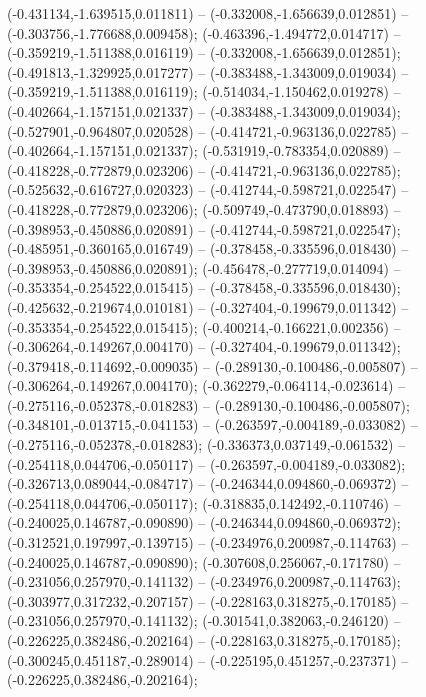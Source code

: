 (-0.431134,-1.639515,0.011811) -- (-0.332008,-1.656639,0.012851) -- (-0.303756,-1.776688,0.009458);
 (-0.463396,-1.494772,0.014717) -- (-0.359219,-1.511388,0.016119) -- (-0.332008,-1.656639,0.012851);
 (-0.491813,-1.329925,0.017277) -- (-0.383488,-1.343009,0.019034) -- (-0.359219,-1.511388,0.016119);
 (-0.514034,-1.150462,0.019278) -- (-0.402664,-1.157151,0.021337) -- (-0.383488,-1.343009,0.019034);
 (-0.527901,-0.964807,0.020528) -- (-0.414721,-0.963136,0.022785) -- (-0.402664,-1.157151,0.021337);
 (-0.531919,-0.783354,0.020889) -- (-0.418228,-0.772879,0.023206) -- (-0.414721,-0.963136,0.022785);
 (-0.525632,-0.616727,0.020323) -- (-0.412744,-0.598721,0.022547) -- (-0.418228,-0.772879,0.023206);
 (-0.509749,-0.473790,0.018893) -- (-0.398953,-0.450886,0.020891) -- (-0.412744,-0.598721,0.022547);
 (-0.485951,-0.360165,0.016749) -- (-0.378458,-0.335596,0.018430) -- (-0.398953,-0.450886,0.020891);
 (-0.456478,-0.277719,0.014094) -- (-0.353354,-0.254522,0.015415) -- (-0.378458,-0.335596,0.018430);
 (-0.425632,-0.219674,0.010181) -- (-0.327404,-0.199679,0.011342) -- (-0.353354,-0.254522,0.015415);
 (-0.400214,-0.166221,0.002356) -- (-0.306264,-0.149267,0.004170) -- (-0.327404,-0.199679,0.011342);
 (-0.379418,-0.114692,-0.009035) -- (-0.289130,-0.100486,-0.005807) -- (-0.306264,-0.149267,0.004170);
 (-0.362279,-0.064114,-0.023614) -- (-0.275116,-0.052378,-0.018283) -- (-0.289130,-0.100486,-0.005807);
 (-0.348101,-0.013715,-0.041153) -- (-0.263597,-0.004189,-0.033082) -- (-0.275116,-0.052378,-0.018283);
 (-0.336373,0.037149,-0.061532) -- (-0.254118,0.044706,-0.050117) -- (-0.263597,-0.004189,-0.033082);
 (-0.326713,0.089044,-0.084717) -- (-0.246344,0.094860,-0.069372) -- (-0.254118,0.044706,-0.050117);
 (-0.318835,0.142492,-0.110746) -- (-0.240025,0.146787,-0.090890) -- (-0.246344,0.094860,-0.069372);
 (-0.312521,0.197997,-0.139715) -- (-0.234976,0.200987,-0.114763) -- (-0.240025,0.146787,-0.090890);
 (-0.307608,0.256067,-0.171780) -- (-0.231056,0.257970,-0.141132) -- (-0.234976,0.200987,-0.114763);
 (-0.303977,0.317232,-0.207157) -- (-0.228163,0.318275,-0.170185) -- (-0.231056,0.257970,-0.141132);
 (-0.301541,0.382063,-0.246120) -- (-0.226225,0.382486,-0.202164) -- (-0.228163,0.318275,-0.170185);
 (-0.300245,0.451187,-0.289014) -- (-0.225195,0.451257,-0.237371) -- (-0.226225,0.382486,-0.202164);
